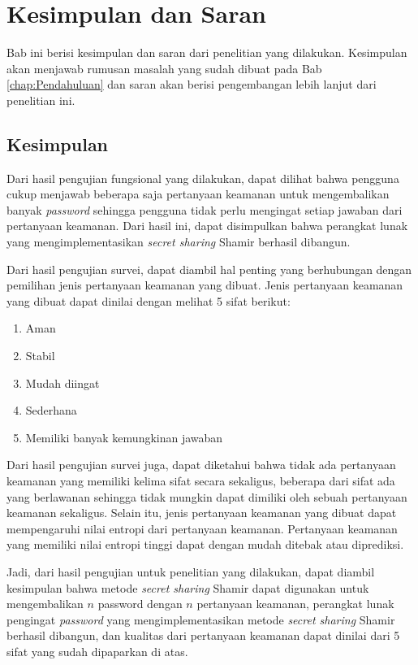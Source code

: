 \chapter{Kesimpulan dan Saran}
\label{chap:Kesimpulan dan Saran}

Bab ini berisi kesimpulan dan saran dari penelitian yang dilakukan. Kesimpulan akan menjawab rumusan masalah yang sudah dibuat pada Bab \ref{chap:Pendahuluan} dan saran akan berisi pengembangan lebih lanjut dari penelitian ini.

\section{Kesimpulan}

Dari hasil pengujian fungsional yang dilakukan, dapat dilihat bahwa pengguna cukup menjawab beberapa saja pertanyaan keamanan untuk mengembalikan banyak \textit{password} sehingga pengguna tidak perlu mengingat setiap jawaban dari pertanyaan keamanan. Dari hasil ini, dapat disimpulkan bahwa perangkat lunak yang mengimplementasikan \textit{secret sharing} Shamir berhasil dibangun.

Dari hasil pengujian survei, dapat diambil hal penting yang berhubungan dengan pemilihan jenis pertanyaan keamanan yang dibuat. Jenis pertanyaan keamanan yang dibuat dapat dinilai dengan melihat 5 sifat berikut:

\begin{enumerate}[itemsep=0mm]
	\item Aman
	\item Stabil
	\item Mudah diingat
	\item Sederhana
	\item Memiliki banyak kemungkinan jawaban
\end{enumerate}

Dari hasil pengujian survei juga, dapat diketahui bahwa tidak ada pertanyaan keamanan yang memiliki kelima sifat secara sekaligus, beberapa dari sifat ada yang berlawanan sehingga tidak mungkin dapat dimiliki oleh sebuah pertanyaan keamanan sekaligus. Selain itu, jenis pertanyaan keamanan yang dibuat dapat mempengaruhi nilai entropi dari pertanyaan keamanan. Pertanyaan keamanan yang memiliki nilai entropi tinggi dapat dengan mudah ditebak atau diprediksi.

Jadi, dari hasil pengujian untuk penelitian yang dilakukan, dapat diambil kesimpulan bahwa metode \textit{secret sharing} Shamir dapat digunakan untuk mengembalikan $n$ password dengan $n$ pertanyaan keamanan, perangkat lunak pengingat \textit{password} yang mengimplementasikan metode \textit{secret sharing} Shamir berhasil dibangun, dan kualitas dari pertanyaan keamanan dapat dinilai dari 5 sifat yang sudah dipaparkan di atas.

